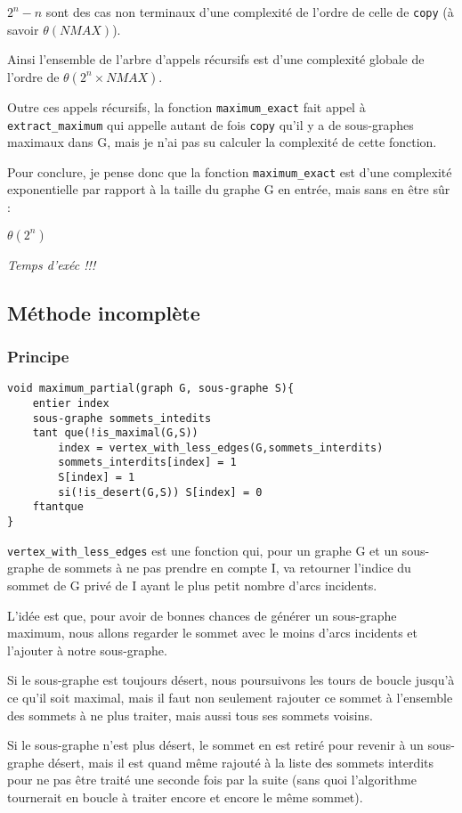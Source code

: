$2^n-n$ sont des cas non terminaux d'une complexité de l'ordre de celle de \verb|copy| (à savoir $\theta(NMAX)$).

Ainsi l'ensemble de l'arbre d'appels récursifs est d'une complexité globale de l'ordre de $\theta(2^n \times NMAX)$. 

Outre  ces appels récursifs, la fonction \verb|maximum_exact| fait appel à \verb|extract_maximum| qui appelle autant de fois \verb|copy| qu'il y a de sous-graphes maximaux dans G, mais je n'ai pas su calculer la complexité de cette fonction.

Pour conclure, je pense donc que la fonction \verb|maximum_exact| est d'une complexité exponentielle par rapport à la taille du graphe G en entrée, mais sans en être sûr :

$\theta(2^n)$

\emph{Temps d'exéc !!!} 

\subsection{Méthode incomplète}

\subsubsection{Principe}

\begin{verbatim}
void maximum_partial(graph G, sous-graphe S){
    entier index
    sous-graphe sommets_intedits
    tant que(!is_maximal(G,S))
        index = vertex_with_less_edges(G,sommets_interdits)
        sommets_interdits[index] = 1
        S[index] = 1
        si(!is_desert(G,S)) S[index] = 0
    ftantque
}
\end{verbatim}
\verb|vertex_with_less_edges| est une fonction qui, pour un graphe G et un sous-graphe de sommets à ne pas prendre en compte I, va retourner l'indice du sommet de G privé de I ayant le plus petit nombre d'arcs incidents. 

L'idée est que, pour avoir de bonnes chances de générer un sous-graphe maximum, nous allons regarder le sommet avec le moins d'arcs incidents et l'ajouter à notre sous-graphe. 

Si le sous-graphe est toujours désert, nous poursuivons les tours de boucle jusqu'à ce qu'il soit maximal,  mais il faut non seulement rajouter ce sommet à l'ensemble des sommets à ne plus traiter, mais aussi tous ses sommets voisins. 

Si le sous-graphe n'est plus désert, le sommet en est retiré pour revenir à un sous-graphe désert, mais il est quand même rajouté à la liste des sommets interdits pour ne pas être traité une seconde fois par la suite (sans quoi l'algorithme tournerait en boucle à traiter encore et encore le même sommet). 

